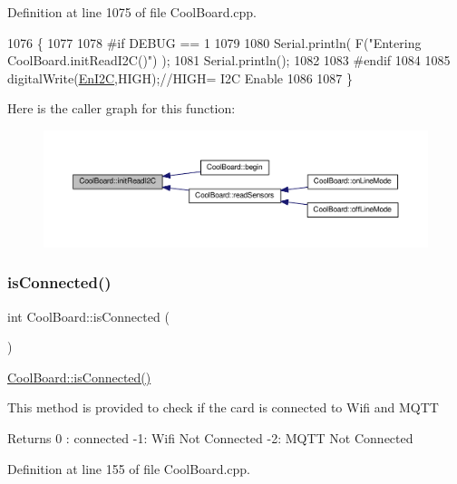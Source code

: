Definition at line 1075 of file Cool\+Board.\+cpp.


\begin{DoxyCode}
1076 \{
1077 
1078 \textcolor{preprocessor}{#if DEBUG == 1}
1079 
1080     Serial.println( F(\textcolor{stringliteral}{"Entering CoolBoard.initReadI2C()"}) );
1081     Serial.println();
1082 
1083 \textcolor{preprocessor}{#endif}
1084  
1085     digitalWrite(\hyperlink{class_cool_board_af1fe1376fc66f93dee80b327ca695377}{EnI2C},HIGH);\textcolor{comment}{//HIGH= I2C Enable}
1086 
1087 \}
\end{DoxyCode}
Here is the caller graph for this function\+:\nopagebreak
\begin{figure}[H]
\begin{center}
\leavevmode
\includegraphics[width=350pt]{d7/df9/class_cool_board_a397b46fadab8f530a8cf4d914c561366_icgraph}
\end{center}
\end{figure}
\mbox{\label{class_cool_board_ad7442cf4b62c7b0d5bd62a0f75ffc065}} 
\subsubsection{\texorpdfstring{is\+Connected()}{isConnected()}}
{\footnotesize\ttfamily int Cool\+Board\+::is\+Connected (\begin{DoxyParamCaption}{ }\end{DoxyParamCaption})}

\hyperlink{class_cool_board_ad7442cf4b62c7b0d5bd62a0f75ffc065}{Cool\+Board\+::is\+Connected()}

This method is provided to check if the card is connected to Wifi and M\+Q\+TT

\begin{DoxyReturn}{Returns}
0 \+: connected -\/1\+: Wifi Not Connected -\/2\+: M\+Q\+TT Not Connected 
\end{DoxyReturn}


Definition at line 155 of file Cool\+Board.\+cpp.


